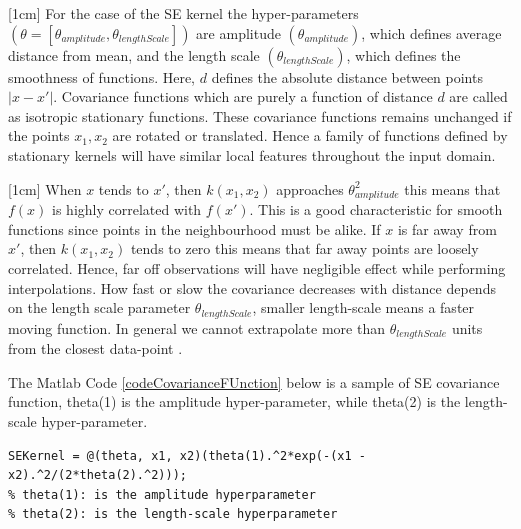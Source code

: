 [1cm]
For the case of the SE kernel the hyper-parameters $(\theta = [\theta_{amplitude}, \theta_{lengthScale}])$ are amplitude $(\theta_{amplitude})$, which defines average distance from mean, and the length scale $(\theta_{lengthScale})$, which defines the smoothness of functions. Here, $d$ defines the absolute distance between points $|x-x'|$. Covariance functions which are purely a function of distance $d$ are called as isotropic stationary functions. These covariance functions remains unchanged if the points $x_{1}, x_{2}$ are rotated or translated. Hence a family of functions defined by stationary kernels will have similar local features throughout the input domain. 

[1cm]
When $x$ tends to $x'$, then $k(x_{1}, x_{2})$ approaches $\theta_{amplitude}^{2}$ this means that $f(x)$ is highly correlated with $f(x')$. This is a good characteristic for smooth functions since points in the neighbourhood must be alike. If $x$ is far away from  $x'$, then $k(x_{1}, x_{2})$ tends to zero this means that far away points are loosely correlated. Hence, far off observations will have negligible effect while performing interpolations. How fast or slow the covariance decreases with distance depends on the length scale parameter $\theta_{lengthScale}$, smaller length-scale means a faster moving function. In general we cannot extrapolate more than $\theta_{lengthScale}$ units from the closest data-point \cite{duvenaud-thesis-2014}. 

The Matlab Code \ref{codeCovarianceFUnction} below is a sample of SE covariance function, theta(1) is the amplitude hyper-parameter, while theta(2) is the length-scale hyper-parameter.
\begin{mdframed}[hidealllines=true,backgroundcolor=lightgray!20]
\begin{lstlisting}[caption={A SE covariance function}, 
                    captionpos=b, 
                    label={codeCovarianceFUnction},
                    style=Matlab-editor, 
                    basicstyle=\color{black}\ttfamily\small,
                    backgroundcolor = \color{MatlabCellColour}]
% Standard exponential covariance function
SEKernel = @(theta, x1, x2)(theta(1).^2*exp(-(x1 - x2).^2/(2*theta(2).^2))); 
% theta(1): is the amplitude hyperparameter
% theta(2): is the length-scale hyperparameter
\end{lstlisting}
\end{mdframed}

